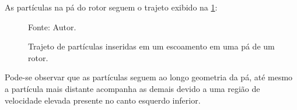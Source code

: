 As partículas na pá do rotor seguem o trajeto exibido na \ref{rotor_trajectory}:
\begin{figure}[H]
    \centering
     {\raggedleft \scriptsize Fonte: Autor.}
    \caption{Trajeto de partículas inseridas em um escoamento em uma pá de um rotor.}
    \label{rotor_trajectory}
\end{figure}

Pode-se observar que as partículas seguem ao longo geometria da pá, até mesmo a partícula mais distante acompanha as demais devido a uma região de velocidade elevada presente no canto esquerdo inferior.
